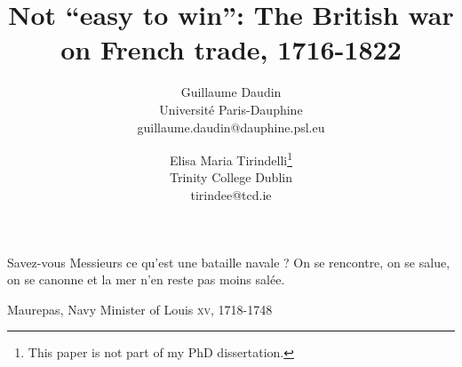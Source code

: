 \documentclass[12pt,a4paper,notitlepage,english]{article}
\begin{document}
\title{Not ``easy to win'':
The British war on French trade, 1716-1822}
\author{
  Guillaume Daudin \\ Université Paris-Dauphine \\guillaume.daudin@dauphine.psl.eu		
  \and
  Elisa Maria Tirindelli\footnote{This paper is not part of my PhD dissertation.} \\ Trinity College Dublin  \\ tirindee@tcd.ie
}
\date{}
\maketitle


\epigraph{Savez-vous Messieurs ce qu’est une bataille navale ? On se rencontre, on se salue, on se canonne et la mer n’en reste pas moins salée.}{Maurepas, Navy Minister of Louis  \textsc{xv}, 1718-1748}
\end{document}
